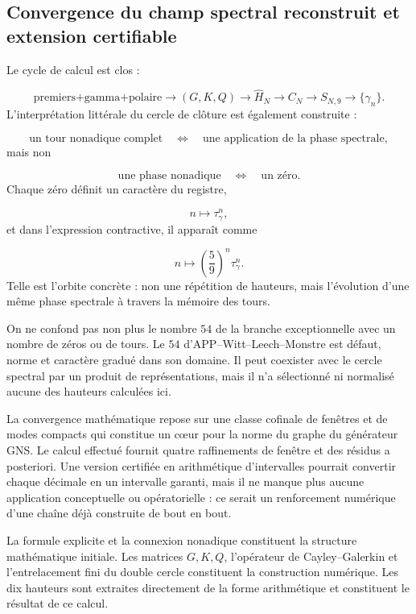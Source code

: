 \subsection{Convergence du champ spectral reconstruit et extension certifiable}
Le cycle de calcul est clos :\par
\[
\text{premiers+gamma+polaire}
\longrightarrow
(G,K,Q)
\longrightarrow
\widehat H_N
\longrightarrow
C_N
\longrightarrow
S_{N,9}
\longrightarrow
\{\gamma_n\}.
\]
L'interprétation littérale du cercle de clôture est également construite :\par
\[
\text{un tour nonadique complet}
\quad\Longleftrightarrow\quad
\text{une application de la phase spectrale},
\]
mais non\par
\[
\text{une phase nonadique}
\quad\Longleftrightarrow\quad
\text{un zéro}.
\]
Chaque zéro définit un caractère du registre,\par
\[
n\longmapsto\tau_\gamma^n,
\]
et dans l'expression contractive, il apparaît comme\par
\[
n\longmapsto
\left(\frac59\right)^n\tau_\gamma^n.
\]
Telle est l'orbite concrète : non une répétition de hauteurs, mais l'évolution d'une même phase spectrale à travers la mémoire des tours.\par
On ne confond pas non plus le nombre \(54\) de la branche exceptionnelle avec un nombre de zéros ou de tours. Le \(54\) d'APP–Witt–Leech–Monstre est défaut, norme et caractère gradué dans son domaine. Il peut coexister avec le cercle spectral par un produit de représentations, mais il n'a sélectionné ni normalisé aucune des hauteurs calculées ici.\par
La convergence mathématique repose sur une classe cofinale de fenêtres et de modes compacts qui constitue un cœur pour la norme du graphe du générateur GNS. Le calcul effectué fournit quatre raffinements de fenêtre et des résidus a posteriori. Une version certifiée en arithmétique d'intervalles pourrait convertir chaque décimale en un intervalle garanti, mais il ne manque plus aucune application conceptuelle ou opératorielle : ce serait un renforcement numérique d'une chaîne déjà construite de bout en bout.\par
La formule explicite et la connexion nonadique constituent la structure mathématique initiale. Les matrices \(G,K,Q\), l'opérateur de Cayley–Galerkin et l'entrelacement fini du double cercle constituent la construction numérique. Les dix hauteurs sont extraites directement de la forme arithmétique et constituent le résultat de ce calcul.\par
